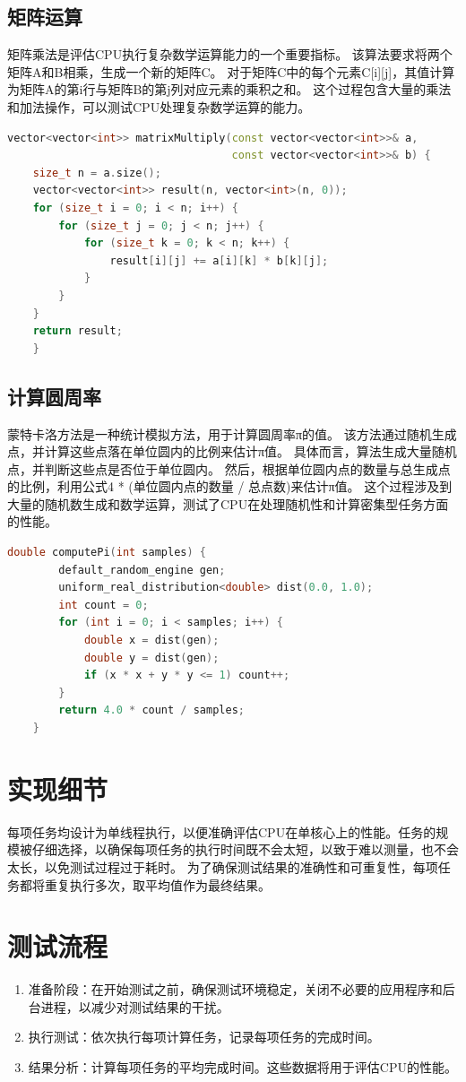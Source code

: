 \documentclass{ctexart}
\begin{document}
\subsection{矩阵运算}
矩阵乘法是评估CPU执行复杂数学运算能力的一个重要指标。
该算法要求将两个矩阵A和B相乘，生成一个新的矩阵C。
对于矩阵C中的每个元素C[i][j]，其值计算为矩阵A的第i行与矩阵B的第j列对应元素的乘积之和。
这个过程包含大量的乘法和加法操作，可以测试CPU处理复杂数学运算的能力。
\begin{lstlisting}[language=C++]
vector<vector<int>> matrixMultiply(const vector<vector<int>>& a,
                                   const vector<vector<int>>& b) {
    size_t n = a.size();
    vector<vector<int>> result(n, vector<int>(n, 0));
    for (size_t i = 0; i < n; i++) {
        for (size_t j = 0; j < n; j++) {
            for (size_t k = 0; k < n; k++) {
                result[i][j] += a[i][k] * b[k][j];
            }
        }
    }
    return result;
    }
\end{lstlisting}
\subsection{计算圆周率}
蒙特卡洛方法是一种统计模拟方法，用于计算圆周率π的值。
该方法通过随机生成点，并计算这些点落在单位圆内的比例来估计π值。
具体而言，算法生成大量随机点，并判断这些点是否位于单位圆内。
然后，根据单位圆内点的数量与总生成点的比例，利用公式4 * (单位圆内点的数量 / 总点数)来估计π值。
这个过程涉及到大量的随机数生成和数学运算，测试了CPU在处理随机性和计算密集型任务方面的性能。
\begin{lstlisting}[language=C++]
    double computePi(int samples) {
        default_random_engine gen;
        uniform_real_distribution<double> dist(0.0, 1.0);
        int count = 0;
        for (int i = 0; i < samples; i++) {
            double x = dist(gen);
            double y = dist(gen);
            if (x * x + y * y <= 1) count++;
        }
        return 4.0 * count / samples;
    }
\end{lstlisting}
\section{实现细节}
每项任务均设计为单线程执行，以便准确评估CPU在单核心上的性能。任务的规模被仔细选择，以确保每项任务的执行时间既不会太短，以致于难以测量，也不会太长，以免测试过程过于耗时。
为了确保测试结果的准确性和可重复性，每项任务都将重复执行多次，取平均值作为最终结果。
\section{测试流程}
\begin{enumerate}
    \item 准备阶段：在开始测试之前，确保测试环境稳定，关闭不必要的应用程序和后台进程，以减少对测试结果的干扰。
    \item 执行测试：依次执行每项计算任务，记录每项任务的完成时间。
    \item 结果分析：计算每项任务的平均完成时间。这些数据将用于评估CPU的性能。
\end{enumerate}
\end{document}
